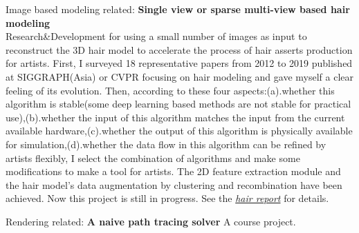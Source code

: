 \documentclass{article} %
\begin{document}
\begin{section}{Image based modeling related:}
  {\bf Single view or sparse multi-view based hair modeling} \\Research\&Development for using a small number of images as input to reconstruct the 3D hair model to accelerate the process of hair asserts production for artists. First, I surveyed 18 representative papers from 2012 to 2019 published at SIGGRAPH(Asia) or CVPR focusing on hair modeling and gave myself a clear feeling of its evolution. Then, according to these four aspects:(a).whether this algorithm is stable(some deep learning based methods are not stable for practical use),(b).whether the input of this algorithm matches the input from the current available hardware,(c).whether the output of this algorithm is physically available for simulation,(d).whether the data flow in this algorithm can be refined by artists flexibly, I select the combination of algorithms and make some modifications to make a tool for artists. The 2D feature extraction module and the hair model's data augmentation by clustering and recombination have been achieved. Now this project is still in progress. See the \emph{\href{https://wtyatzoo.github.io/reports/hair.pdf}{hair report}} for details. 
\end{section}
\begin{section}{Rendering related:}
  {\bf A naive path tracing solver} A course project.   
\end{section}


 

\end{document}
